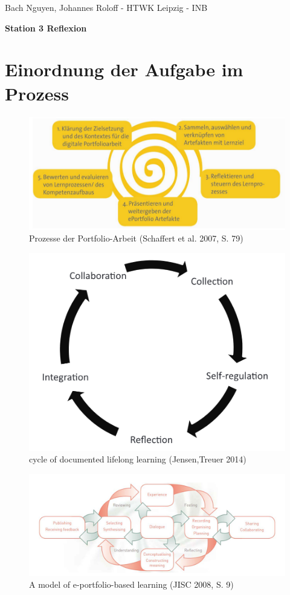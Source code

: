 \documentclass[a4paper,oneside]{scrarticle}
\begin{document}
	\begin{flushleft}
		Bach Nguyen, Johannes Roloff - HTWK Leipzig - INB
	\end{flushleft}
	\begin{center}
		\begin{LARGE}
			\textbf{Station 3 Reflexion}
		\end{LARGE}
	\end{center}
	\section*{Einordnung der Aufgabe im Prozess}
	\begin{figure} [h]
		\centering
		\includegraphics[width=0.7\linewidth]{e-portfolio-prozesse-schaffert}
		\caption{Prozesse der Portfolio-Arbeit (Schaffert et al. 2007, S. 79)}
		\label{fig:e-portfolio-prozesse-schaffert}
	\end{figure}
	\begin{figure}[h]
		\centering
		\includegraphics[width=0.5\linewidth]{cycle-of-documented-lifelong-learning-Jensen}
		\caption{cycle of documented lifelong learning (Jensen,Treuer 2014)}
		\label{fig:cycle-of-documented-lifelong-learning-jensen}
	\end{figure}
	\begin{figure}[h]
		\centering
		\includegraphics[width=0.8\linewidth]{model-of-e-portfolio-based-learning}
		\caption{A model of e-portfolio-based learning (JISC 2008, S. 9)}
		\label{fig:model-of-e-portfolio-based-learning}
	\end{figure}
	\pagebreak 
	
\end{document}
